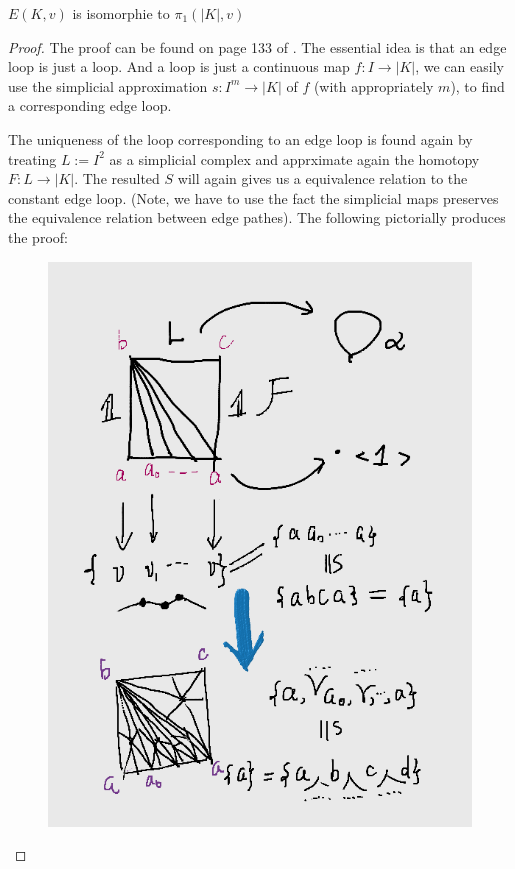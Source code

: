 \begin{thm}
    $E(K,v)$ is isomorphie to $\pi_1(|K|,v)$
\end{thm}
\begin{proof}
    The proof can be found on page 133 of \cite{book}. The essential
    idea is that an edge loop is just a loop. And a loop is just a
    continuous map $f:I\to |K|$, we can easily use the simplicial
    approximation $s:I^m\to |K|$ of $f$ (with appropriately $m$), to
    find a corresponding edge loop.

    The uniqueness of the loop corresponding to an edge loop is found
    again by treating $L:=I^2$ as a simplicial complex and apprximate
    again the homotopy $F:L\to |K|$. The resulted $S$ will again gives
    us a equivalence relation to the constant edge loop. (Note, we
    have to use the fact the simplicial maps preserves the equivalence
    relation between edge pathes). The following pictorially
    produces the proof:
    \begin{figure}[H]
        \centering
        \includegraphics[width=1\linewidth]{pics/ch6-notes-2/L.png}
    \end{figure}
\end{proof}


